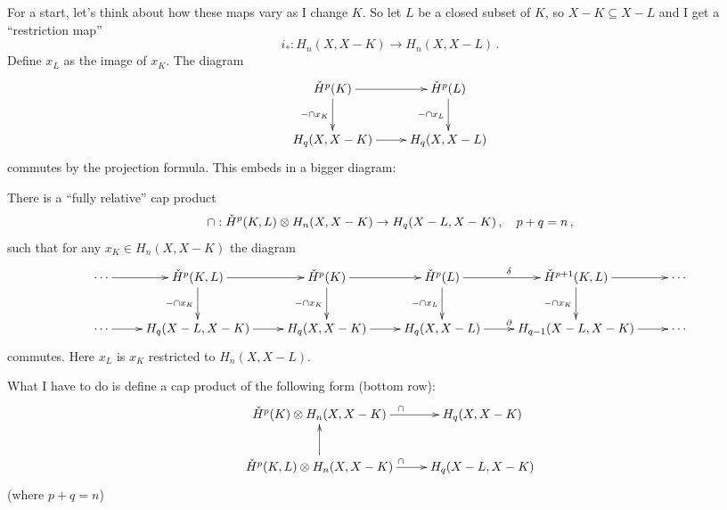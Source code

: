 For a start, let's think about how these maps vary as I change $K$.
So let $L$ be a closed subset of $K$, so $X-K\subseteq X-L$ and I get 
a ``restriction map''
\[
i_\ast:H_n(X,X-K)\to H_n(X,X-L)\,.
\]
Define $x_L$ as the image of $x_K$. The diagram
\begin{equation*}
\xymatrix{
\cHH^p(K)\ar[r]\ar[d]_{-\cap x_K} & \cHH^p(L) \ar[d]_{-\cap x_L} \\
H_q(X,X-K)\ar[r] & H_q(X,X-L)
}
\end{equation*}
commutes by the projection formula. This embeds in a bigger diagram:
\begin{theorem}
There is a ``fully relative'' cap product
\[
\cap:\check{H}^p(K,L)\otimes H_n(X,X-K)\to H_q(X-L,X-K)\,,\quad p+q=n\,,
\]
such that for any $x_K\in H_n(X,X-K)$ the diagram
\begin{equation*}
\xymatrix{
\cdots \ar[r] & \cHH^p(K,L)\ar[r]\ar[d]_{-\cap x_{K}} & \cHH^p(K)\ar[r]\ar[d]_{-\cap x_K} & \cHH^p(L)\ar[r]^\delta\ar[d]_{-\cap x_L} & \cHH^{p+1}(K,L)\ar[r]\ar[d]_{-\cap x_{K}} & \cdots\\
	\cdots\ar[r] & H_q(X-L,X-K)\ar[r]& H_q(X,X-K)\ar[r] & H_q(X,X-L)\ar[r]^\partial & H_{q-1}(X-L,X-K)\ar[r] & \cdots
}
\end{equation*}
commutes. Here $x_L$ is $x_K$ restricted to $H_n(X,X-L)$. 
\end{theorem}
What I have to do is define a cap product of the following form (bottom row):
\begin{equation*}
\xymatrix{
	\cHH^p(K)\otimes H_n(X,X-K)\ar[r]^{\cap} & H_q(X,X-K)\\
	\cHH^p(K,L)\otimes H_n(X,X-K)\ar[u]\ar[r]^{\cap} & H_q(X-L,X-K)
}
\end{equation*}
(where $p+q=n$)



